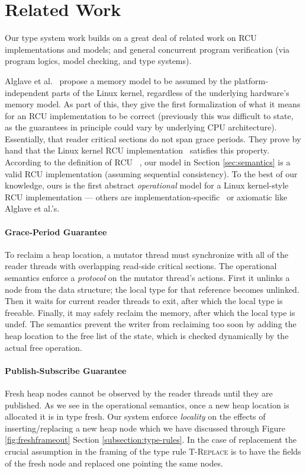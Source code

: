 \section{Related Work}
\label{sec:relatedwork}
Our type system work builds on a great deal of related work on RCU implementations and models; and general concurrent program verification (via program logics, model checking, and type systems).

Alglave et al.~\cite{Alglave:2018:FSC:3173162.3177156} propose a memory model to be assumed by the platform-independent parts of the Linux kernel, regardless of the underlying hardware's memory model.
As part of this, they give the first formalization of what it means for an RCU implementation to be correct (previously this was difficult to state, as the guarantees in principle could vary by underlying CPU architecture). Essentially, that reader critical sections do not span grace periods. They prove by hand that the Linux kernel RCU implementation~\cite{DBLP:conf/cav/AlglaveKT13,abssem} satisfies this property. According to the definition of \textsf{RCU} ~\cite{abssem,Alglave:2018:FSC:3173162.3177156}, our model in Section \ref{sec:semantics} is a valid RCU implementation (assuming sequential consistency). To the best of our knowledge, ours is the first abstract \emph{operational} model for a Linux kernel-style RCU implementation --- others are implementation-specific~\cite{Mandrykin:2016:TDV:3001219.3001297} or axiomatic like Alglave et al.'s.

\paragraph{Grace-Period Guarantee} To reclaim a heap location, a mutator thread must synchronize with all of the reader threads with overlapping read-side critical sections.
The operational semantics enforce a \textit{protocol} on the mutator thread's actions. First it unlinks a node from the data structure; the local type for that reference becomes \textsf{unlinked}. Then it waits for current reader threads to exit, after which the local type is \textsf{freeable}. Finally, it may safely reclaim the memory, after which the local type is \textsf{undef}.
The semantics prevent the writer from reclaiming too soon by adding the heap location to the free list of the state, which is checked dynamically by the actual free operation.

\paragraph{Publish-Subscribe Guarantee} Fresh heap nodes cannot be observed by the reader threads until they are published. As we see in the operational semantics, once a new heap location is allocated it is in type \textsf{fresh}. Our system enforce \textit{locality} on the effects of inserting/replacing a new heap node which we have discussed through Figure \ref{fig:freshframeout} Section \ref{subsection:type-rules}. In the case of replacement the crucial assumption in the framing of the type rule \textsc{T-Replace} is to have the fields of the fresh node and replaced one pointing the same nodes.

